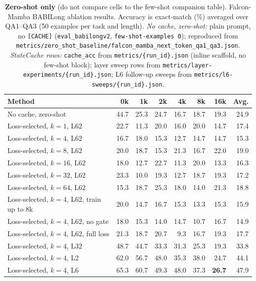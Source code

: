 \begin{table}[t]
\centering
\small
\setlength{\tabcolsep}{4pt}
\caption{\textbf{Zero-shot only} (do not compare cells to the few-shot companion table). Falcon-Mamba BABILong ablation results. Accuracy is exact-match (\%) averaged over QA1--QA3 (50 examples per task and length). \emph{No cache, zero-shot:} plain prompt, no \texttt{[CACHE]} (\texttt{eval\_babilongv2}, \texttt{few-shot-examples 0}); reproduced from \texttt{metrics/zero\_shot\_baseline/falcon\_mamba\_next\_token\_qa1\_qa3.json}. \emph{StateCache rows:} \texttt{cache\_acc} from \texttt{metrics/\{run\_id\}.json} (inline scaffold, no few-shot block); layer sweep rows from \texttt{metrics/layer-experiments/\{run\_id\}.json}; L6 follow-up sweeps from \texttt{metrics/l6-sweeps/\{run\_id\}.json}.}
\label{tab:babilong-ablation-results}
\begin{tabular}{lrrrrrrr}
\toprule
\textbf{Method} & \textbf{0k} & \textbf{1k} & \textbf{2k} & \textbf{4k} & \textbf{8k} & \textbf{16k} & \textbf{Avg.} \\
\midrule
No cache, zero-shot & 44.7 & 25.3 & 24.7 & 16.7 & 18.7 & 19.3 & 24.9 \\
\midrule
Loss-selected, $k=1$, L62 & 22.7 & 11.3 & 20.0 & 16.0 & 20.0 & 14.7 & 17.4 \\
Loss-selected, $k=4$, L62 & 16.7 & 18.0 & 15.3 & 12.7 & 14.7 & 14.7 & 15.3 \\
Loss-selected, $k=8$, L62 & 20.0 & 18.7 & 15.3 & 21.3 & 16.7 & 22.0 & 19.0 \\
Loss-selected, $k=16$, L62 & 18.0 & 12.7 & 22.7 & 11.3 & 20.0 & 13.3 & 16.3 \\
Loss-selected, $k=32$, L62 & 23.3 & 10.0 & 19.3 & 12.7 & 18.7 & 19.3 & 17.2 \\
Loss-selected, $k=64$, L62 & 15.3 & 18.7 & 25.3 & 18.0 & 14.0 & 21.3 & 18.8 \\
Loss-selected, $k=4$, L62, train up to 8k & 20.0 & 14.7 & 16.7 & 15.3 & 13.3 & 15.3 & 15.9 \\
Loss-selected, $k=4$, L62, no gate & 18.0 & 15.3 & 14.0 & 14.7 & 10.7 & 16.7 & 14.9 \\
Loss-selected, $k=4$, L62, full loss & 21.3 & 18.7 & 20.7 & 9.3 & 16.7 & 19.3 & 17.7 \\
Loss-selected, $k=4$, L32 & 48.7 & 44.7 & 33.3 & 31.3 & 25.3 & 19.3 & 33.8 \\
Loss-selected, $k=4$, L2 & 62.0 & 56.7 & 48.0 & 35.3 & 38.0 & 24.7 & 44.1 \\
Loss-selected, $k=4$, L6 & 65.3 & 60.7 & 49.3 & 48.0 & 37.3 & \textbf{26.7} & 47.9 \\

\end{tabular}
\end{table}
